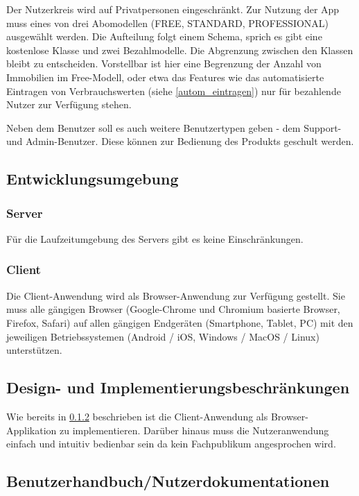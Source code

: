 Der Nutzerkreis wird auf Privatpersonen eingeschränkt.
Zur Nutzung der App muss eines von drei Abomodellen (FREE, STANDARD, PROFESSIONAL) ausgewählt werden.
Die Aufteilung folgt einem  Schema, sprich es gibt eine kostenlose Klasse und zwei Bezahlmodelle. Die Abgrenzung zwischen den Klassen bleibt zu entscheiden. Vorstellbar ist hier eine Begrenzung der Anzahl von Immobilien im Free-Modell, oder etwa das Features wie das automatisierte Eintragen von Verbrauchswerten (siehe \ref{autom_eintragen}) nur für bezahlende Nutzer zur Verfügung stehen.

Neben dem Benutzer soll es auch weitere Benutzertypen geben - dem Support- und Admin-Benutzer. Diese können zur Bedienung des Produkts geschult werden.

\subsection{Entwicklungsumgebung}

\subsubsection{Server}

Für die Laufzeitumgebung des Servers gibt es keine Einschränkungen.

\subsubsection{Client}
\label{subsec:OEclient}
Die Client-Anwendung wird als Browser-Anwendung zur Verfügung gestellt. Sie muss alle gängigen Browser (Google-Chrome und Chromium basierte Browser, Firefox, Safari) auf allen gängigen Endgeräten (Smartphone, Tablet, PC) mit den jeweiligen Betriebssystemen (Android / iOS, Windows / MacOS / Linux) unterstützen.

\subsection{Design- und Implementierungsbeschränkungen}

Wie bereits in \ref{subsec:OEclient} beschrieben ist die Client-Anwendung als Browser-Applikation zu implementieren. Darüber hinaus muss die Nutzeranwendung einfach und intuitiv bedienbar sein da kein Fachpublikum angesprochen wird.

\subsection{Benutzerhandbuch/Nutzerdokumentationen}

